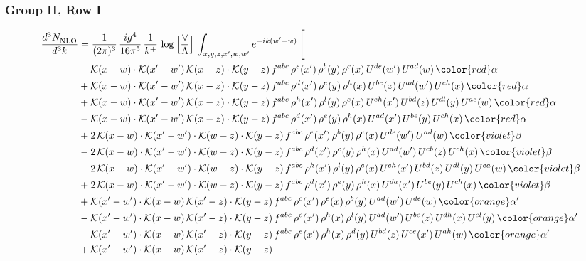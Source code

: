 \subsubsection{Group II, Row I}
\begin{align}
     \frac{d^{3}N_{\rm NLO}^{\rm}}{d^{3}k}  & = \frac{1}{(2\pi)^{3}}\, \frac{ig^{4}}{16\pi^{5}}\, \frac{1}{k^{+}}\, \log{\left[\frac{\vee}{\Lambda}\right]}\, \int_{x,y,z,x^{\prime},w,w^{\prime}}e^{-ik(w^{\prime}-w)}\, \Bigg[\notag \\ & -\mathcal{K}(x-w)\cdot \mathcal{K}(x'-w')\, \mathcal{K}(x-z)\cdot \mathcal{K}(y-z)\, f^{abc}\, \rho^{e}(x')\,\rho^{b}(y)\,\rho^{c}(x)\,U^{de}(w')\,U^{ad}(w)\,{\color{red}\alpha}\notag \\ & + \mathcal{K}(x-w)\cdot \mathcal{K}(x'-w')\, \mathcal{K}(x-z)\cdot \mathcal{K}(y-z)\, f^{abc}\, \rho^{d}(x')\,\rho^{e}(y)\,\rho^{h}(x)\,U^{be}(z)\,U^{ad}(w')\,U^{ch}(x)\,{\color{red}\alpha}\notag \\ & + \mathcal{K}(x-w)\cdot \mathcal{K}(x'-w')\, \mathcal{K}(x-z)\cdot \mathcal{K}(y-z)\, f^{abc}\, \rho^{h}(x')\,\rho^{l}(y)\,\rho^{c}(x)\,U^{eh}(x')\,U^{bd}(z)\,U^{dl}(y)\,U^{ae}(w)\,{\color{red}\alpha}\notag \\ & -\mathcal{K}(x-w)\cdot \mathcal{K}(x'-w')\, \mathcal{K}(x-z)\cdot \mathcal{K}(y-z)\, f^{abc}\, \rho^{d}(x')\,\rho^{e}(y)\,\rho^{h}(x)\,U^{ad}(x')\,U^{be}(y)\,U^{ch}(x)\,{\color{red}\alpha}\notag \\ & + 2\,\mathcal{K}(x-w)\cdot \mathcal{K}(x'-w')\cdot \mathcal{K}(w-z)\cdot \mathcal{K}(y-z)\, f^{abc}\, \rho^{e}(x')\,\rho^{b}(y)\,\rho^{c}(x)\,U^{de}(w')\,U^{ad}(w)\,{\color{violet}\beta}\notag \\ & - 2\,\mathcal{K}(x-w)\cdot \mathcal{K}(x'-w')\cdot \mathcal{K}(w-z)\cdot \mathcal{K}(y-z)\, f^{abc}\, \rho^{d}(x')\,\rho^{e}(y)\,\rho^{h}(x)\,U^{ad}(w')\,U^{eb}(z)\,U^{ch}(x)\,{\color{violet}\beta}\notag \\ & - 2\,\mathcal{K}(x-w)\cdot \mathcal{K}(x'-w')\cdot \mathcal{K}(w-z)\cdot \mathcal{K}(y-z)\, f^{abc}\, \rho^{h}(x')\,\rho^{l}(y)\,\rho^{c}(x)\,U^{eh}(x')\,U^{bd}(z)\,U^{dl}(y)\,U^{ea}(w)\,{\color{violet}\beta}\notag \\ &  + 2\,\mathcal{K}(x-w)\cdot \mathcal{K}(x'-w')\cdot \mathcal{K}(w-z)\cdot \mathcal{K}(y-z)\, f^{abc}\, \rho^{d}(x')\,\rho^{e}(y)\,\rho^{h}(x)\,U^{da}(x')\,U^{be}(y)\,U^{ch}(x)\,{\color{violet}\beta}\notag \\ & + \mathcal{K}(x'-w')\cdot \mathcal{K}(x-w)\, \mathcal{K}(x'-z)\cdot \mathcal{K}(y-z)\, f^{abc}\,\rho^{c}(x')\,\rho^{e}(x)\,\rho^{b}(y)\, U^{ad}(w')\,U^{de}(w)\, {\color{orange} \alpha'}\notag \\ & -\mathcal{K}(x'-w')\cdot \mathcal{K}(x-w)\, \mathcal{K}(x'-z)\cdot \mathcal{K}(y-z)\, f^{abc}\,\rho^{c}(x')\,\rho^{h}(x)\,\rho^{l}(y)\, U^{ad}(w')\,U^{be}(z)\,U^{dh}(x)\,U^{el}(y)\, {\color{orange} \alpha'}\notag \\ & -\mathcal{K}(x'-w')\cdot \mathcal{K}(x-w)\, \mathcal{K}(x'-z)\cdot \mathcal{K}(y-z)\, f^{abc}\,\rho^{e}(x')\,\rho^{h}(x)\,\rho^{d}(y)\, U^{bd}(z)\,U^{ce}(x')\,U^{ah}(w)\, {\color{orange} \alpha'}\notag \\ & +\mathcal{K}(x'-w')\cdot \mathcal{K}(x-w)\, \mathcal{K}(x'-z)\cdot \mathcal{K}(y-z)\, 
\end{align}

